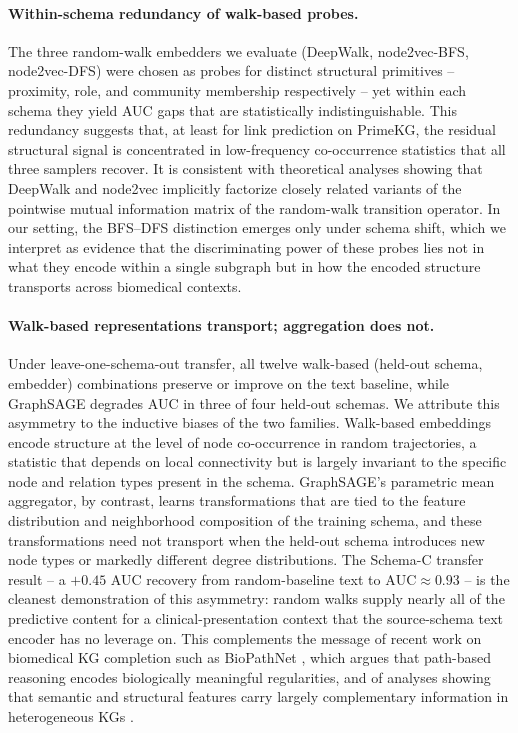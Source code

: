 \documentclass{article}
\theoremstyle{plain}
\theoremstyle{definition}
\theoremstyle{remark}
\begin{document}
\paragraph{Within-schema redundancy of walk-based probes.}
The three random-walk embedders we evaluate (DeepWalk, node2vec-BFS, node2vec-DFS) were chosen as probes for distinct structural primitives -- proximity, role, and community membership respectively -- yet within each schema they yield AUC gaps that are statistically indistinguishable. This redundancy suggests that, at least for link prediction on PrimeKG, the residual structural signal is concentrated in low-frequency co-occurrence statistics that all three samplers recover. It is consistent with theoretical analyses showing that DeepWalk and node2vec implicitly factorize closely related variants of the pointwise mutual information matrix of the random-walk transition operator. In our setting, the BFS--DFS distinction emerges only under schema shift, which we interpret as evidence that the discriminating power of these probes lies not in what they encode within a single subgraph but in how the encoded structure transports across biomedical contexts.

\paragraph{Walk-based representations transport; aggregation does not.}
Under leave-one-schema-out transfer, all twelve walk-based (held-out schema, embedder) combinations preserve or improve on the text baseline, while GraphSAGE degrades AUC in three of four held-out schemas. We attribute this asymmetry to the inductive biases of the two families. Walk-based embeddings encode structure at the level of node co-occurrence in random trajectories, a statistic that depends on local connectivity but is largely invariant to the specific node and relation types present in the schema. GraphSAGE's parametric mean aggregator, by contrast, learns transformations that are tied to the feature distribution and neighborhood composition of the training schema, and these transformations need not transport when the held-out schema introduces new node types or markedly different degree distributions. The Schema-C transfer result -- a $+0.45$ AUC recovery from random-baseline text to $\mathrm{AUC}\approx 0.93$ -- is the cleanest demonstration of this asymmetry: random walks supply nearly all of the predictive content for a clinical-presentation context that the source-schema text encoder has no leverage on. This complements the message of recent work on biomedical KG completion such as BioPathNet \citep{biopathnet2025}, which argues that path-based reasoning encodes biologically meaningful regularities, and of analyses showing that semantic and structural features carry largely complementary information in heterogeneous KGs \citep{rpiss2024}.
\end{document}
